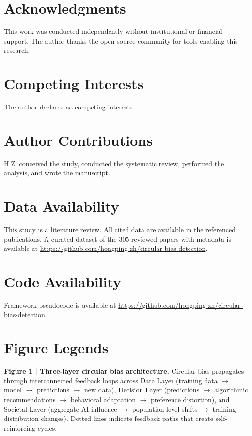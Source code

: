 \documentclass[11pt]{article}
\begin{document}
\section*{Acknowledgments}
This work was conducted independently without institutional or financial support. The author thanks the open-source community for tools enabling this research.

\section*{Competing Interests}
The author declares no competing interests.

\section*{Author Contributions}
H.Z. conceived the study, conducted the systematic review, performed the analysis, and wrote the manuscript.

\section*{Data Availability}
This study is a literature review. All cited data are available in the referenced publications. A curated dataset of the 305 reviewed papers with metadata is available at \url{https://github.com/hongping-zh/circular-bias-detection}.

\section*{Code Availability}
Framework pseudocode is available at \url{https://github.com/hongping-zh/circular-bias-detection}.



\newpage

\section*{Figure Legends}

\textbf{Figure 1 | Three-layer circular bias architecture.} Circular bias propagates through interconnected feedback loops across Data Layer (training data $\rightarrow$ model $\rightarrow$ predictions $\rightarrow$ new data), Decision Layer (predictions $\rightarrow$ algorithmic recommendations $\rightarrow$ behavioral adaptation $\rightarrow$ preference distortion), and Societal Layer (aggregate AI influence $\rightarrow$ population-level shifts $\rightarrow$ training distribution changes). Dotted lines indicate feedback paths that create self-reinforcing cycles.
\end{document}
